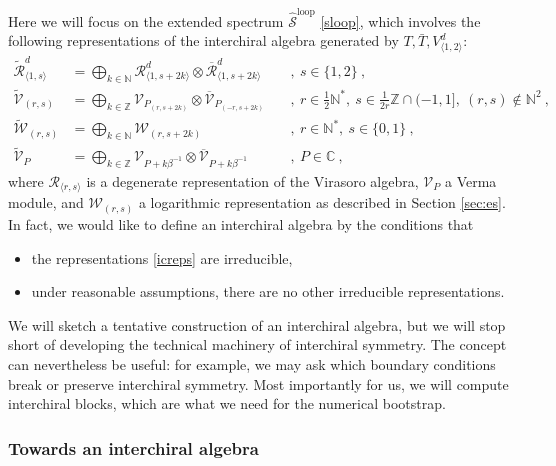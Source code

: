 \documentclass[12pt, a4paper]{article}
\begin{document}
Here we will focus on the extended spectrum $\widehat{\mathcal{S}}^\text{loop}$ \eqref{sloop}, which involves the following representations of the interchiral algebra generated by $T,\bar T,V^d_{\langle 1,2\rangle}$:
\begin{subequations}
\label{icreps}
 \begin{alignat}{2}
 \widetilde{\mathcal{R}}^d_{\langle 1,s\rangle} &= \bigoplus_{k\in \mathbb{N}} \mathcal{R}^d_{\langle 1,s+2k \rangle} \otimes \overline{\mathcal{R}}^d_{\langle 1, s+2k\rangle} 
 && \ , \ s\in \{1, 2\}\ , 
 \label{wrd}
 \\
  \widetilde{\mathcal{V}}_{(r,s)} &= \bigoplus_{k\in\mathbb{Z}} \mathcal{V}_{P_{(r,s+2k)}}\otimes \overline{\mathcal{V}}_{P_{(-r,s+2k)}} && \ , \  r\in \tfrac12\mathbb{N}^*,\ s\in \tfrac{1}{2r}\mathbb{Z}\cap (-1, 1],\ (r,s)\notin \mathbb{N}^2\ , 
 \label{wvrs}
 \\
 \widetilde{\mathcal{W}}_{(r,s)} &= \bigoplus_{k\in \mathbb{N}} \mathcal{W}_{(r, s+2k)} && \ , \ r\in \mathbb{N}^*,\ s\in \{0,1\}\ ,
 \label{wlog}
 \\
   \widetilde{\mathcal{V}}_P &= \bigoplus_{k\in\mathbb{Z}} \mathcal{V}_{P+k\beta^{-1}}\otimes \overline{\mathcal{V}}_{P+k\beta^{-1}} && \ , \ P\in \mathbb{C}\ ,
 \label{wvp}
 \end{alignat}
\end{subequations}
where $\mathcal{R}_{\langle r,s\rangle}$ is a degenerate representation of the Virasoro algebra, $\mathcal{V}_P$ a Verma module, and $\mathcal{W}_{(r,s)}$ a logarithmic representation as described in Section \ref{sec:es}. In fact, we would like to define an interchiral algebra by the conditions that 
\begin{itemize}
 \item the representations \eqref{icreps} are irreducible,
 \item under reasonable assumptions, there are no other irreducible representations. 
\end{itemize}
We will sketch a tentative construction of an interchiral algebra, but we will stop short of developing the technical machinery of interchiral symmetry. The concept can nevertheless be useful: for example, we may ask which boundary conditions break or preserve interchiral symmetry. Most importantly for us, we will compute interchiral blocks, which are what we need for the numerical bootstrap. 


\subsubsection{Towards an interchiral algebra}
\end{document}
